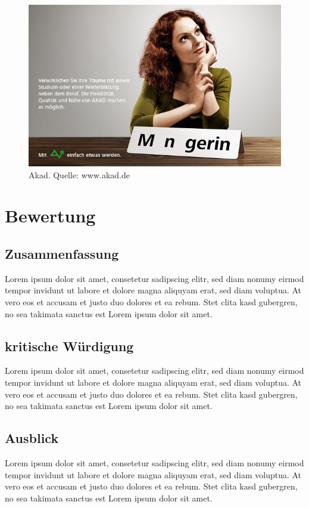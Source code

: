 \documentclass[a4paper,12pt]{article}
\begin{document}
\begin{figure}[H]
\begin{center}
\includegraphics[scale=0.5]{akad_bild1.jpg}
\caption{Akad. Quelle: www.akad.de}
\end{center}
\end{figure}


\section{Bewertung}

\subsection{Zusammenfassung}
Lorem ipsum dolor sit amet, consetetur sadipscing elitr, sed diam nonumy eirmod tempor invidunt ut labore et dolore magna aliquyam erat, sed diam voluptua. At vero eos et accusam et justo duo dolores et ea rebum. Stet clita kasd gubergren, no sea takimata sanctus est Lorem ipsum dolor sit amet.

\subsection{kritische Würdigung}
Lorem ipsum dolor sit amet, consetetur sadipscing elitr, sed diam nonumy eirmod tempor invidunt ut labore et dolore magna aliquyam erat, sed diam voluptua. At vero eos et accusam et justo duo dolores et ea rebum. Stet clita kasd gubergren, no sea takimata sanctus est Lorem ipsum dolor sit amet.

\subsection{Ausblick}
Lorem ipsum dolor sit amet, consetetur sadipscing elitr, sed diam nonumy eirmod tempor invidunt ut labore et dolore magna aliquyam erat, sed diam voluptua. At vero eos et accusam et justo duo dolores et ea rebum. Stet clita kasd gubergren, no sea takimata sanctus est Lorem ipsum dolor sit amet.
\end{document}
